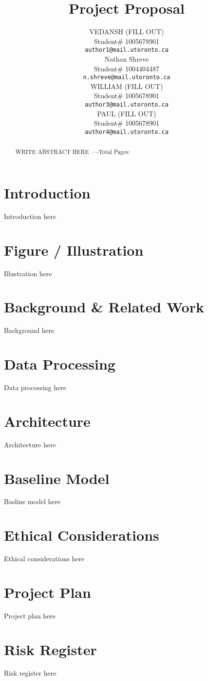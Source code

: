 \documentclass{article} %
\title{Project Proposal}
\author{VEDANSH (FILL OUT)  \\
Student\# 1005678901 \\
\texttt{author1@mail.utoronto.ca} \\
\And
Nathan Shreve  \\
Student\# 1004404487 \\
\texttt{n.shreve@mail.utoronto.ca} \\
\AND
WILLIAM (FILL OUT)  \\
Student\# 1005678901 \\
\texttt{author3@mail.utoronto.ca} \\
\And
PAUL (FILL OUT) \\
Student\# 1005678901 \\
\texttt{author4@mail.utoronto.ca} \\
\AND
}
\begin{document}
\maketitle

\begin{abstract}
WRITE ABSTRACT HERE
----Total Pages: \pageref{last_page}
\end{abstract}



\section{Introduction}
\label{intro}

Introduction here

\section{Figure / Illustration}
\label{illustration}

Illustration here

\section{Background \& Related Work}
\label{background}

Background here

\section{Data Processing}
\label{data}

Data processing here

\section{Architecture}
\label{arch}

Architecture here

\section{Baseline Model}
\label{baseline}

Basline model here

\section{Ethical Considerations}
\label{ethical}

Ethical considerations here

\section{Project Plan}
\label{plan}

Project plan here

\section{Risk Register}
\label{risk}

Risk register here

\label{last_page}



\end{document}
